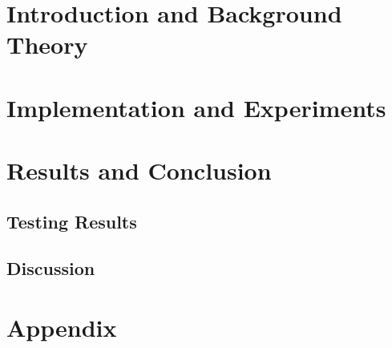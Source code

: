 
\addtolength{\evensidemargin}{-12mm}

%
%
\part{Introduction and Background Theory}
\label{part:introAndBackgroundTheory}



%

%
\part{Implementation and Experiments}
\label{part:experimentsAndResults}



\part[Results and Conclusion]{Results and Conclusion}
\label{part:resultsAndConclusion}
\chapter{Testing Results}
\chapter{Discussion}

%
%

\part*{Appendix}

\appendix %

%
